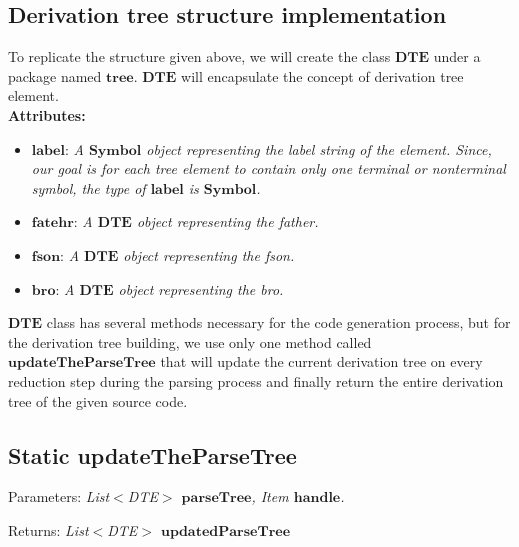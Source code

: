 \vspace{10pt}

\subsection{Derivation tree structure implementation}

To replicate the structure given above, we will create the class \(\boldsymbol{DTE}\) under a package named \(\boldsymbol{tree}\). \(\boldsymbol{DTE}\) will encapsulate the concept of derivation tree element.\\

\textbf{Attributes:}
\begin{itemize}
    \item \(\boldsymbol{label}\): \textit{A \(\boldsymbol{Symbol}\) object representing the label string of the element. Since, our goal is for each tree element to contain only one terminal or nonterminal symbol, the type of \(\boldsymbol{label}\) is \(\boldsymbol{Symbol}\).}
    \item \(\boldsymbol{fatehr}\): \textit{A \(\boldsymbol{DTE}\) object representing the father.}
    \item \(\boldsymbol{fson}\): \textit{A \(\boldsymbol{DTE}\) object representing the fson.}
    \item \(\boldsymbol{bro}\): \textit{A \(\boldsymbol{DTE}\) object representing the bro.}
\end{itemize}

\(\boldsymbol{DTE}\) class has several methods necessary for the code generation process, but for the derivation tree building, we use only one method called \(\boldsymbol{updateTheParseTree}\) that will update the current derivation tree on every reduction step during the parsing process and finally return the entire derivation tree of the given source code.

\vspace{10pt}

\subsection{Static updateTheParseTree}

Parameters: \textit{List\(<\)DTE\(>\) \(\boldsymbol{parseTree}\), Item \(\boldsymbol{handle}\).}

Returns: \textit{List\(<\)DTE\(>\) \(\boldsymbol{updatedParseTree}\)}\\

